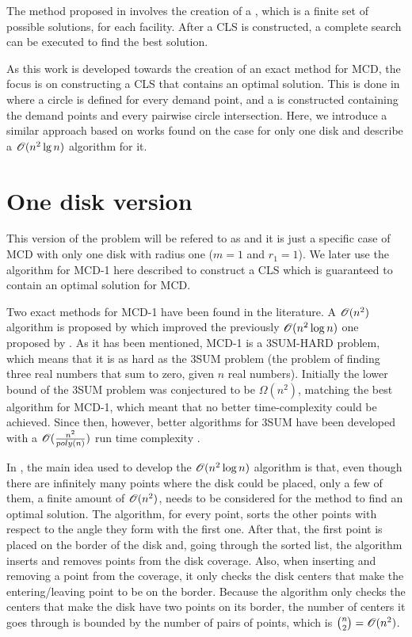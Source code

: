 The method proposed in  involves the creation of a , which is a finite set of possible solutions, for each facility. After a CLS is constructed, a complete search can be executed to find the best solution.

As this work is developed towards the creation of an exact method for MCD, the focus is on constructing a CLS that contains an optimal solution.
This is done in  where a circle is defined for every demand point, and a  is constructed containing the demand points and every pairwise circle intersection.
Here, we introduce a similar approach based on works found on the case for only one disk and describe a $\mathscr{O}(n^2\lg{n})$ algorithm for it.


\section{One disk version}

This version of the problem will be refered to as  and it is just a specific case of MCD with only one disk with radius one ($m=1$ and $r_1=1$). We later use the algorithm for MCD-1 here described to construct a CLS which is guaranteed to contain an optimal solution for MCD.

Two exact methods for MCD-1 have been found in the literature. A $\mathscr{O}(n^2)$ algorithm is proposed by  which improved the previously $\mathscr{O}(n^2\log{n})$ one proposed by .
As it has been mentioned, MCD-1 is a 3SUM-HARD problem, which means that it is as hard as the 3SUM problem (the problem of finding three real numbers that sum to zero, given $n$ real numbers). Initially the lower bound of the 3SUM problem was conjectured to be $\Omega(n^2)$, matching the best algorithm for MCD-1, which meant that no better time-complexity could be achieved. Since then, however, better algorithms for 3SUM have been developed with a $\mathscr{O}(\frac{n^2}{poly(n)})$ run time complexity \cite{3SUM-kopelowitz:2014}.


In , the main idea used to develop the $\mathscr{O}(n^2\log{n})$ algorithm is that, even though there are infinitely many points where the disk could be placed, only a few of them, a finite amount of $\mathscr{O}(n^2)$, needs to be considered for the method to find an optimal solution.
The algorithm, for every point, sorts the other points with respect to the angle they form with the first one. After that, the first point is placed on the border of the disk and, going through the sorted list, the algorithm inserts and removes points from the disk coverage. Also, when inserting and removing a point from the coverage, it only checks the disk centers that make the entering/leaving point to be on the border. Because the algorithm only checks the centers that make the disk have two points on its border, the number of centers it goes through is bounded by the number of pairs of points, which is $\binom{n}{2} = \mathscr{O}(n^2)$.


